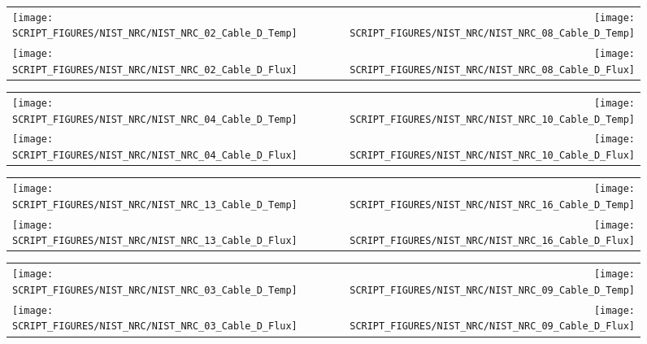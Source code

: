 \begin{figure}[p]
\begin{tabular*}{\textwidth}{l@{\extracolsep{\fill}}r}
\texttt{[image: SCRIPT\_FIGURES/NIST\_NRC/NIST\_NRC\_02\_Cable\_D\_Temp]} &
\texttt{[image: SCRIPT\_FIGURES/NIST\_NRC/NIST\_NRC\_08\_Cable\_D\_Temp]} \\
\texttt{[image: SCRIPT\_FIGURES/NIST\_NRC/NIST\_NRC\_02\_Cable\_D\_Flux]} &
\texttt{[image: SCRIPT\_FIGURES/NIST\_NRC/NIST\_NRC\_08\_Cable\_D\_Flux]}
\end{tabular*}
\label{NIST_NRC_D_2_and_8}
\end{figure}

\clearpage

\begin{figure}[p]
\begin{tabular*}{\textwidth}{l@{\extracolsep{\fill}}r}
\texttt{[image: SCRIPT\_FIGURES/NIST\_NRC/NIST\_NRC\_04\_Cable\_D\_Temp]} &
\texttt{[image: SCRIPT\_FIGURES/NIST\_NRC/NIST\_NRC\_10\_Cable\_D\_Temp]} \\
\texttt{[image: SCRIPT\_FIGURES/NIST\_NRC/NIST\_NRC\_04\_Cable\_D\_Flux]} &
\texttt{[image: SCRIPT\_FIGURES/NIST\_NRC/NIST\_NRC\_10\_Cable\_D\_Flux]}
\end{tabular*}
\label{NIST_NRC_D_4_and_10}
\end{figure}

\begin{figure}[p]
\begin{tabular*}{\textwidth}{l@{\extracolsep{\fill}}r}
\texttt{[image: SCRIPT\_FIGURES/NIST\_NRC/NIST\_NRC\_13\_Cable\_D\_Temp]} &
\texttt{[image: SCRIPT\_FIGURES/NIST\_NRC/NIST\_NRC\_16\_Cable\_D\_Temp]} \\
\texttt{[image: SCRIPT\_FIGURES/NIST\_NRC/NIST\_NRC\_13\_Cable\_D\_Flux]} &
\texttt{[image: SCRIPT\_FIGURES/NIST\_NRC/NIST\_NRC\_16\_Cable\_D\_Flux]}
\end{tabular*}
\label{NIST_NRC_D_13_and_16}
\end{figure}

\clearpage

\begin{figure}[p]
\begin{tabular*}{\textwidth}{l@{\extracolsep{\fill}}r}
\texttt{[image: SCRIPT\_FIGURES/NIST\_NRC/NIST\_NRC\_03\_Cable\_D\_Temp]} &
\texttt{[image: SCRIPT\_FIGURES/NIST\_NRC/NIST\_NRC\_09\_Cable\_D\_Temp]} \\
\texttt{[image: SCRIPT\_FIGURES/NIST\_NRC/NIST\_NRC\_03\_Cable\_D\_Flux]} &
\texttt{[image: SCRIPT\_FIGURES/NIST\_NRC/NIST\_NRC\_09\_Cable\_D\_Flux]}
\end{tabular*}
\label{NIST_NRC_D_3_and_9}
\end{figure}

